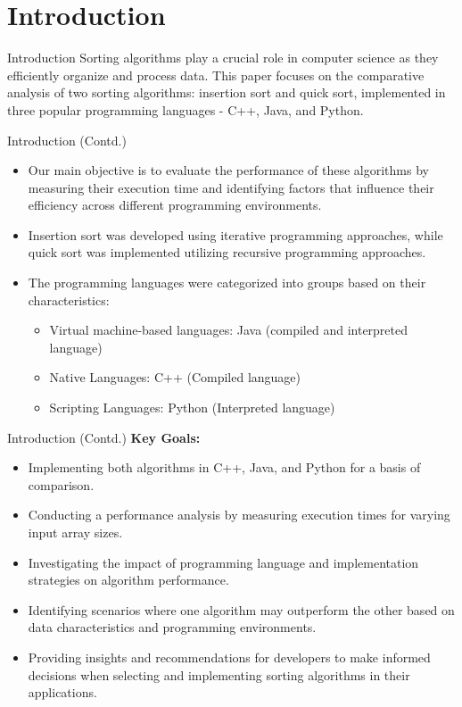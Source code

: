 \section{Introduction}

\begin{frame}{Introduction}
    Sorting algorithms play a crucial role in computer science as they efficiently organize and process data.\cite{1}
    This paper focuses on the comparative analysis of two sorting algorithms: insertion sort and quick sort, implemented in three popular programming languages - C++, Java, and Python.
\end{frame}

\begin{frame}{Introduction (Contd.)}
    \begin{itemize}
        \item Our main objective is to evaluate the performance of these algorithms by measuring their execution time and identifying factors that influence their efficiency across different programming environments.
        \item Insertion sort was developed using iterative programming approaches, while quick sort was implemented utilizing recursive programming approaches.
        \item \cite{1}\cite{2}
        The programming languages were categorized into groups based on their characteristics:
            \begin{itemize}
                \item Virtual machine-based languages: Java (compiled and interpreted language)
                \item Native Languages: C++ (Compiled language)
                \item Scripting Languages: Python (Interpreted language)\cite{3}
            \end{itemize}
    \end{itemize}
\end{frame}

\begin{frame}{Introduction (Contd.)}
    \textbf{Key Goals:}
    \begin{itemize}
        \item Implementing both algorithms in C++, Java, and Python for a basis of comparison.
        \item Conducting a performance analysis by measuring execution times for varying input array sizes.
        \item Investigating the impact of programming language and implementation strategies on algorithm performance.
        \item Identifying scenarios where one algorithm may outperform the other based on data characteristics and programming environments.
        \item Providing insights and recommendations for developers to make informed decisions when selecting and implementing sorting algorithms in their applications.
    \end{itemize}
\end{frame}

